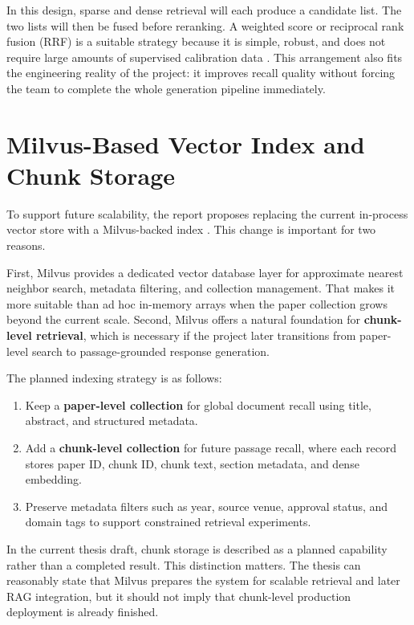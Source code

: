 \documentclass[11pt,a4paper,oneside]{report}
\begin{document}
In this design, sparse and dense retrieval will each produce a candidate list. The two
lists will then be fused before reranking. A weighted score or reciprocal rank fusion
(RRF) is a suitable strategy because it is simple, robust, and does not require large
amounts of supervised calibration data \cite{cormack2009}. This arrangement also fits
the engineering reality of the project: it improves recall quality without forcing the
team to complete the whole generation pipeline immediately.

\section{Milvus-Based Vector Index and Chunk Storage}

To support future scalability, the report proposes replacing the current in-process
vector store with a Milvus-backed index \cite{wang2021milvus}. This change is important
for two reasons.

First, Milvus provides a dedicated vector database layer for approximate nearest
neighbor search, metadata filtering, and collection management. That makes it more
suitable than ad hoc in-memory arrays when the paper collection grows beyond the
current scale. Second, Milvus offers a natural foundation for \textbf{chunk-level
retrieval}, which is necessary if the project later transitions from paper-level search
to passage-grounded response generation.

The planned indexing strategy is as follows:

\begin{enumerate}
  \item Keep a \textbf{paper-level collection} for global document recall using title,
  abstract, and structured metadata.
  \item Add a \textbf{chunk-level collection} for future passage recall, where each record
  stores paper ID, chunk ID, chunk text, section metadata, and dense embedding.
  \item Preserve metadata filters such as year, source venue, approval status, and
  domain tags to support constrained retrieval experiments.
\end{enumerate}

In the current thesis draft, chunk storage is described as a planned capability rather
than a completed result. This distinction matters. The thesis can reasonably state
that Milvus prepares the system for scalable retrieval and later RAG integration, but
it should not imply that chunk-level production deployment is already finished.
\end{document}
